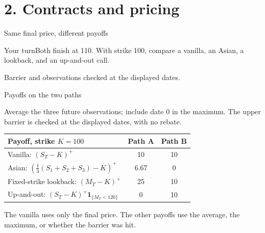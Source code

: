 \documentclass[handout,10pt,t,aspectratio=169]{beamer}
\newenvironment{pausebox}{\begin{block}{Your turn}}{\end{block}}
\newcommand{\ind}{\mathbf 1}
\newcommand{\source}[1]{\vfill{\scriptsize\color{gray}#1\par}}
\begin{document}
\section{2. Contracts and pricing}

\begin{frame}{Same final price, different payoffs}

    \begin{center}\end{center}
    \begin{pausebox}Both finish at 110. With strike 100, compare a vanilla,
    an Asian, a lookback, and an up-and-out call.\end{pausebox}
    \source{Barrier and observations checked at the displayed dates.}
\end{frame}
\begin{frame}{Payoffs on the two paths}

    Average the three future observations; include date 0 in the maximum.
    The upper barrier is checked at the displayed dates, with no rebate.
    \begin{center}\begin{tabular}{L{.47\textwidth}cc}
    \toprule Payoff, strike \(K=100\) & Path A & Path B\\\midrule
    Vanilla: \((S_T-K)^+\) & 10 & 10\\[.5em]
    Asian: \((\tfrac13(S_1+S_2+S_3)-K)^+\) & 6.67 & 0\\[.5em]
    Fixed-strike lookback: \((M_T-K)^+\) & 25 & 10\\[.5em]
    Up-and-out: \((S_T-K)^+\ind_{\{M_T<120\}}\) & 0 & 10\\\bottomrule
    \end{tabular}\end{center}
    The vanilla uses only the final price. The other payoffs use the average,
    the maximum, or whether the barrier was hit.
\end{frame}
\end{document}

